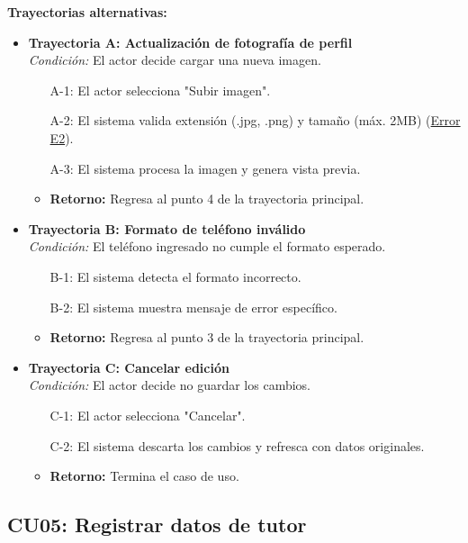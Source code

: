 \begin{appendices}
\textbf{Trayectorias alternativas:}
\begin{itemize}[leftmargin=*]
    \item \textbf{Trayectoria A: Actualización de fotografía de perfil} \\
    \textit{Condición:} El actor decide cargar una nueva imagen.
    \begin{itemize}[nosep]
        \item[A-1:] El actor selecciona "Subir imagen".
        \item[A-2:] El sistema valida extensión (.jpg, .png) y tamaño (máx. 2MB) (\hyperlink{err:E7}{Error E2}).
        \item[A-3:] El sistema procesa la imagen y genera vista previa.
        \item \textbf{Retorno:} Regresa al punto 4 de la trayectoria principal.
    \end{itemize}
    \item \textbf{Trayectoria B: Formato de teléfono inválido} \\
    \textit{Condición:} El teléfono ingresado no cumple el formato esperado.
    \begin{itemize}[nosep]
        \item[B-1:] El sistema detecta el formato incorrecto.
        \item[B-2:] El sistema muestra mensaje de error específico.
        \item \textbf{Retorno:} Regresa al punto 3 de la trayectoria principal.
    \end{itemize}
    \item \textbf{Trayectoria C: Cancelar edición} \\
    \textit{Condición:} El actor decide no guardar los cambios.
    \begin{itemize}[nosep]
        \item[C-1:] El actor selecciona "Cancelar".
        \item[C-2:] El sistema descarta los cambios y refresca con datos originales.
        \item \textbf{Retorno:} Termina el caso de uso.
    \end{itemize}
\end{itemize}

\newpage

\subsection{CU05: Registrar datos de tutor}


\end{appendices}
